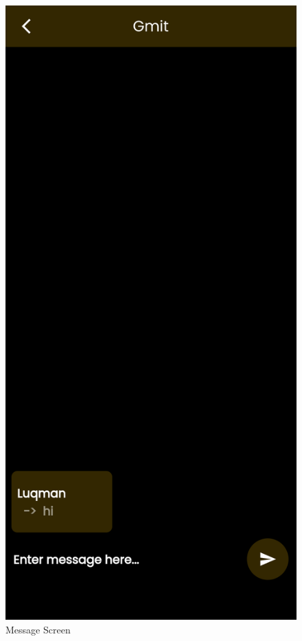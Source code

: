 \begin{figure}[H]
    \centering
    \includegraphics[scale=0.15]{App Screenshots/MessageScreen.png}
    \caption{Message Screen}
    \label{fig:Message Screen}
\end{figure}




